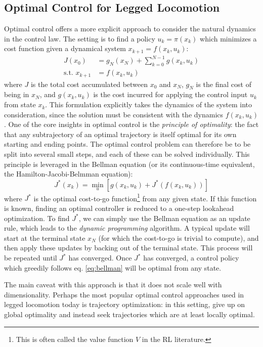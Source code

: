 \subsection{Optimal Control for Legged Locomotion}
Optimal control offers a more explicit approach to consider the natural dynamics in the control law.
The setting is to find a policy $u_k = \pi(x_k)$  which minimizes a cost function given a dynamical system $x_{k+1} = f(x_k, u_k)$:
\begin{align*}
J(x_0) & = g_N(x_N) + \sum_{k=0}^{N-1}g(x_k, u_k) \\
\text{s.t. } x_{k+1} & = f(x_k, u_k)
\end{align*}
where $J$ is the total cost accumulated between $x_0$ and $x_N$, $g_N$ is the final cost of being in $x_N$, and $g(x_k, u_k)$ is the cost incurred for applying the control input $u_k$ from state $x_k$.
This formulation explicitly takes the dynamics of the system into consideration, since the solution must be consistent with the dynamics $f(x_k, u_k)$.
One of the core insights in optimal control is the \emph{principle of optimality}: the fact that any subtrajectory of an optimal trajectory is itself optimal for its own starting and ending points.
The optimal control problem can therefore be to be split into several small steps, and each of these can be solved individually.
This principle is leveraged in the Bellman equation (or its continuous-time equivalent, the Hamilton-Jacobi-Belmman equation):
\begin{equation}\label{eq:bellman}
J^*(x_k) = \min_u\left[g(x_k,u_k) + J^*(f(x_k, u_k)) \right]
\end{equation}
where $J^*$ is the optimal cost-to-go function\footnote{This is often called the value function $V$ in the RL literature.} from any given state. If this function is known, finding an optimal controller is reduced to a one-step lookahead optimization.
To find $J^*$, we can simply use the Bellman equation as an update rule, which leads to the \emph{dynamic programming} algorithm. A typical update will start at the terminal state $x_N$ (for which the cost-to-go is trivial to compute), and then apply these updates by backing out of the terminal state. This process will be repeated until $J^*$ has converged. Once $J^*$ has converged, a control policy which greedily follows eq. \ref{eq:bellman} will be optimal from any state. \par
The main caveat with this approach is that it does not scale well with dimensionality. Perhaps the most popular optimal control approaches used in legged locomotion today is trajectory optimization: in this setting, give up on global optimality and instead seek trajectories which are at least locally optimal.
